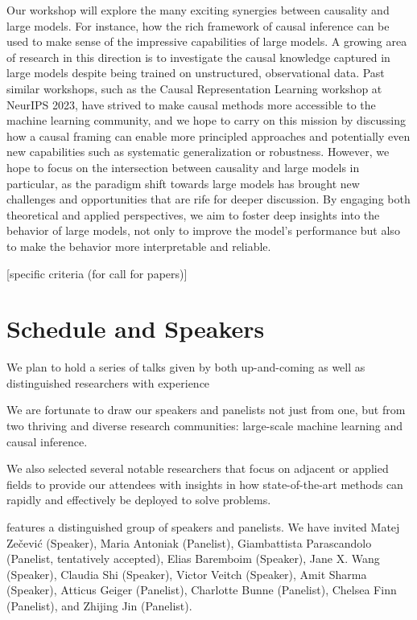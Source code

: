 \documentclass{article}
\begin{document}
Our workshop will explore the many exciting synergies between causality and large models. For instance, how the rich framework of causal inference can be used to make sense of the impressive capabilities of large models. 
A growing area of research in this direction is to investigate the causal knowledge captured in large models despite being trained on unstructured, observational data. 
Past similar workshops, such as the Causal Representation Learning workshop at NeurIPS 2023, have strived to make causal methods more accessible to the machine learning community, and we hope to carry on this mission by discussing how a causal framing can enable more principled approaches and potentially even new capabilities such as systematic generalization or robustness. However, we hope to focus on the intersection between causality and large models in particular, as the paradigm shift towards large models has brought new challenges and opportunities that are rife for deeper discussion.
By engaging both theoretical and applied perspectives, we aim to foster deep insights into the behavior of large models, not only to improve the model's performance but also to make the behavior more interpretable and reliable.

% 

[specific criteria (for call for papers)]


\section{Schedule and Speakers}

We plan to hold a series of talks given by both up-and-coming as well as distinguished researchers with experience

We are fortunate to draw our speakers and panelists not just from one, but from two thriving and diverse research communities: large-scale machine learning and causal inference.

We also selected several notable researchers that focus on adjacent or applied fields to provide our attendees with insights in how state-of-the-art methods can rapidly and effectively be deployed to solve problems.

features a distinguished group of speakers and panelists. We have invited  Matej Zečević (Speaker), Maria Antoniak (Panelist), Giambattista Parascandolo (Panelist, tentatively accepted), Elias Baremboim (Speaker), Jane X. Wang (Speaker), Claudia Shi (Speaker), Victor Veitch (Speaker), Amit Sharma (Speaker), Atticus Geiger (Panelist), Charlotte Bunne (Panelist), Chelsea Finn (Panelist), and Zhijing Jin (Panelist).
\end{document}
